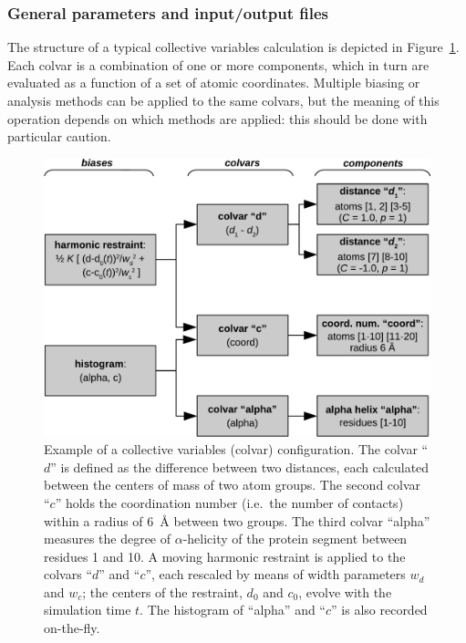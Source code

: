 \subsubsection{General parameters and input/output files}

The structure of a typical collective variables calculation is
depicted in Figure~\ref{fig:colvars_diagram}.  Each colvar is
a combination of one or more components, which in turn are evaluated
as a function of a set of atomic coordinates.  Multiple
biasing or analysis methods can be applied to the same
colvars, but the meaning of this operation depends on which
methods are applied: this should be done with particular caution.


\begin{figure}[!ht]
  \centering
  \includegraphics[width=12cm]{figures/colvars_diagram}
  \caption{Example of a collective variables (colvar) configuration.
    The colvar ``$d$'' is defined as the difference between two
    distances, each calculated between the centers of mass of two
    atom groups.  The second colvar ``$c$'' holds the coordination
    number (i.e.~the number of contacts) within a radius of 6~\AA{}
    between two groups.  The third colvar ``alpha'' measures the
    degree of $\alpha$-helicity of the protein segment between
    residues 1 and 10. A moving harmonic restraint is applied to the
    colvars ``$d$'' and ``$c$'', each rescaled by means of width
    parameters $w_{d}$ and $w_{c}$; the centers of the restraint,
    $d_0$ and $c_0$, evolve with the simulation time $t$.  The
    histogram of ``alpha'' and ``$c$'' is also recorded on-the-fly.}
  \label{fig:colvars_diagram}
\end{figure}


